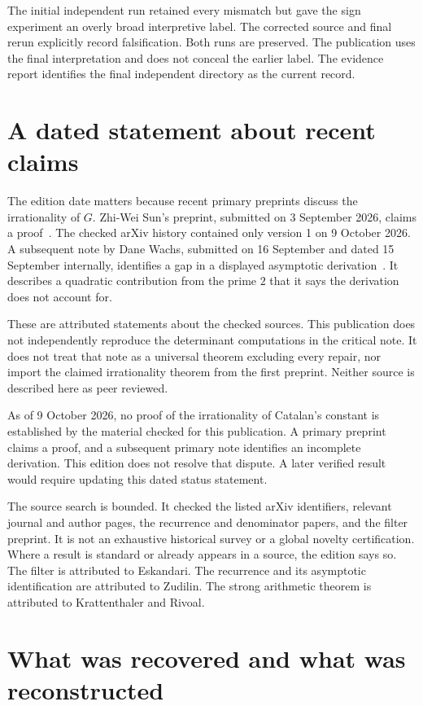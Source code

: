 The initial independent run retained every mismatch but gave the sign experiment an overly broad interpretive label. The corrected source and final rerun explicitly record falsification. Both runs are preserved. The publication uses the final interpretation and does not conceal the earlier label. The evidence report identifies the final independent directory as the current record.

\section{A dated statement about recent claims}

The edition date matters because recent primary preprints discuss the irrationality of $G$. Zhi-Wei Sun's preprint, submitted on 3 September 2026, claims a proof~\cite{Sun2026}. The checked arXiv history contained only version 1 on 9 October 2026. A subsequent note by Dane Wachs, submitted on 16 September and dated 15 September internally, identifies a gap in a displayed asymptotic derivation~\cite{Wachs2026}. It describes a quadratic contribution from the prime $2$ that it says the derivation does not account for.

These are attributed statements about the checked sources. This publication does not independently reproduce the determinant computations in the critical note. It does not treat that note as a universal theorem excluding every repair, nor import the claimed irrationality theorem from the first preprint. Neither source is described here as peer reviewed.

As of 9 October 2026, no proof of the irrationality of Catalan's constant is established by the material checked for this publication. A primary preprint claims a proof, and a subsequent primary note identifies an incomplete derivation. This edition does not resolve that dispute. A later verified result would require updating this dated status statement.

The source search is bounded. It checked the listed arXiv identifiers, relevant journal and author pages, the recurrence and denominator papers, and the filter preprint. It is not an exhaustive historical survey or a global novelty certification. Where a result is standard or already appears in a source, the edition says so. The filter is attributed to Eskandari. The recurrence and its asymptotic identification are attributed to Zudilin. The strong arithmetic theorem is attributed to Krattenthaler and Rivoal.

\section{What was recovered and what was reconstructed}

